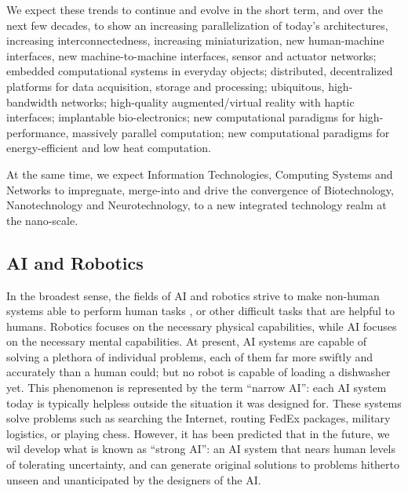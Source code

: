 \documentclass[letter,11pt]{article}
\begin{document}
We expect these trends to continue and evolve in the short term, and over the
next few decades, to show an increasing parallelization of today's
architectures, increasing interconnectedness, increasing miniaturization, new
human-machine interfaces, new machine-to-machine interfaces, sensor and
actuator networks; embedded computational systems in everyday objects;
distributed, decentralized platforms for data acquisition, storage and
processing; ubiquitous, high-bandwidth networks; high-quality augmented/virtual
reality with haptic interfaces; implantable bio-electronics; new computational
paradigms for high-performance, massively parallel computation; new
computational paradigms for energy-efficient and low heat computation.

At the same time, we expect Information Technologies, Computing Systems and
Networks to impregnate, merge-into and drive the convergence of Biotechnology,
Nanotechnology and Neurotechnology, to a new integrated technology realm at the
nano-scale.


\subsection{AI and Robotics}
\label{et-ai}


In the broadest sense, the fields of AI and robotics strive to make non-human systems able to perform human tasks%
, or other difficult tasks that are helpful to humans. Robotics focuses on the necessary physical capabilities, while AI focuses on the necessary mental capabilities. At present, AI systems are capable of solving a plethora of individual problems, each of them far more swiftly and accurately than a human could; but no robot is capable of loading a dishwasher yet.
This phenomenon is represented by the term ``narrow AI'': each AI system today is typically helpless outside the situation it was designed for. These systems solve problems such as searching the Internet, routing FedEx packages, military logistics, or playing chess. However, it has been predicted that in the future, we wil develop what is known as ``strong AI'': an AI system that nears human levels of tolerating uncertainty, and can generate original solutions to problems hitherto unseen and unanticipated by the designers of the AI.
\end{document}
